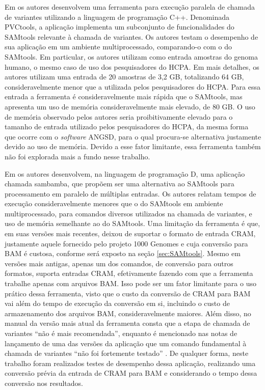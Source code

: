 \documentclass[cic,tc]{iiufrgs}
\begin{document}
Em \cite{jin2019pvctools} os autores desenvolvem uma ferramenta para execução
paralela de chamada de variantes utilizando a linguagem de programação C++.
Denominada PVCtools, a aplicação implementa um subconjunto de funcionalidades
do SAMtools relevante à chamada de variantes. Os autores testam o desempenho de
sua aplicação em um ambiente multiprocessado, comparando-o com o do SAMtools.
Em particular, os autores utilizam como entrada amostras do genoma humano,
o mesmo caso de uso dos pesquisadores do HCPA. Em mais detalhes, os
autores utilizam uma entrada de 20 amostras de 3,2 GB, totalizando 64 GB,
consideravelmente menor que a utilizada pelos pesquisadores do HCPA. Para essa
entrada a ferramenta é consideravelmente mais rápida que o SAMtools, mas
apresenta um uso de memória consideravelmente mais elevado, de 80 GB. O uso de
memória observado pelos autores seria proibitivamente elevado para o tamanho de
entrada utilizado pelos pesquisadores do HCPA, da mesma forma que ocorre com o
\textit{software} ANGSD, para o qual procura-se alternativa justamente devido ao uso
de memória. Devido a esse fator limitante, essa ferramenta também não foi
explorada mais a fundo nesse trabalho.

Em \cite{tarasov2015sambamba} os autores desenvolvem, na linguagem de
programação D, uma aplicação chamada sambamba, que propõem ser uma alternativa
ao SAMtools para processamento em paralelo de múltiplas entradas. Os autores
relatam tempos de execução consideravelmente menores que o do SAMtools em
ambiente multiprocessado, para comandos diversos utilizados na chamada de
variantes, e uso de memória semelhante ao do SAMtools. Uma limitação da
ferramenta é que, em suas versões mais recentes, deixou de suportar o formato
de entrada CRAM, justamente aquele fornecido pelo projeto 1000 Genomes e cuja
conversão para BAM é custosa, conforme será exposto na seção
\ref{sec:SAMtools}. Mesmo em versões mais antigas, apenas um dos comandos, de
conversão para outros formatos, suporta entradas CRAM, efetivamente fazendo com
que a ferramenta trabalhe apenas com arquivos BAM. Isso pode ser um fator
limitante para o uso prático dessa ferramenta, visto que o custo da conversão
de CRAM para BAM vai além do tempo de execução da conversão em si, incluindo o
custo de armazenamento dos arquivos BAM, consideravelmente maiores. Além disso,
no manual da versão mais atual da ferramenta consta que a etapa de chamada de
variantes ``não é mais recomendada'', enquanto é mencionado nas notas de
lançamento de uma das versões da aplicação que um comando fundamental à chamada
de variantes ``não foi fortemente testado'' \cite{manual2015sambamba}. De
qualquer forma, neste trabalho foram realizados testes de desempenho dessa
aplicação, realizando uma conversão prévia da entrada de CRAM para BAM e
considerando o tempo dessa conversão nos resultados.
\end{document}
